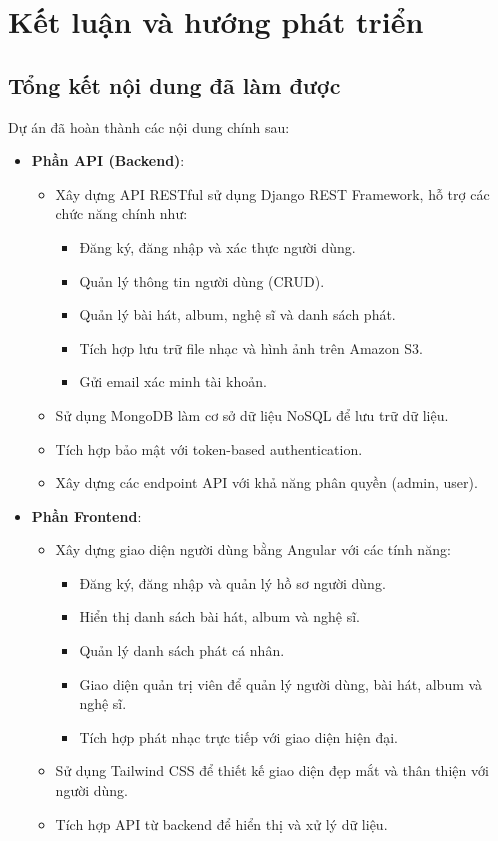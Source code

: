 \chapter{Kết luận và hướng phát triển}

\section{Tổng kết nội dung đã làm được}
Dự án đã hoàn thành các nội dung chính sau:
\begin{itemize}
    \item \textbf{Phần API (Backend)}:
    \begin{itemize}
        \item Xây dựng API RESTful sử dụng Django REST Framework, hỗ trợ các chức năng chính như:
        \begin{itemize}
            \item Đăng ký, đăng nhập và xác thực người dùng.
            \item Quản lý thông tin người dùng (CRUD).
            \item Quản lý bài hát, album, nghệ sĩ và danh sách phát.
            \item Tích hợp lưu trữ file nhạc và hình ảnh trên Amazon S3.
            \item Gửi email xác minh tài khoản.
        \end{itemize}
        \item Sử dụng MongoDB làm cơ sở dữ liệu NoSQL để lưu trữ dữ liệu.
        \item Tích hợp bảo mật với token-based authentication.
        \item Xây dựng các endpoint API với khả năng phân quyền (admin, user).
    \end{itemize}

    \item \textbf{Phần Frontend}:
    \begin{itemize}
        \item Xây dựng giao diện người dùng bằng Angular với các tính năng:
        \begin{itemize}
            \item Đăng ký, đăng nhập và quản lý hồ sơ người dùng.
            \item Hiển thị danh sách bài hát, album và nghệ sĩ.
            \item Quản lý danh sách phát cá nhân.
            \item Giao diện quản trị viên để quản lý người dùng, bài hát, album và nghệ sĩ.
            \item Tích hợp phát nhạc trực tiếp với giao diện hiện đại.
        \end{itemize}
        \item Sử dụng Tailwind CSS để thiết kế giao diện đẹp mắt và thân thiện với người dùng.
        \item Tích hợp API từ backend để hiển thị và xử lý dữ liệu.
    \end{itemize}
\end{itemize}

